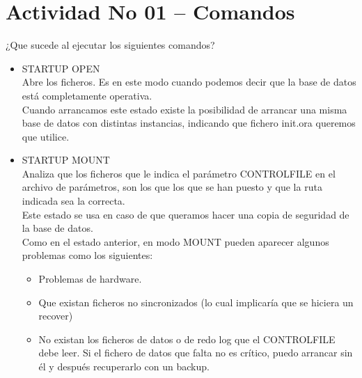 \section{Actividad No 01 – Comandos} 
¿Que sucede al ejecutar los siguientes comandos? 

\begin{itemize}
	\item STARTUP OPEN
	\\Abre los ficheros. Es en este modo cuando podemos decir que la base de datos está
		completamente operativa.
	\\Cuando arrancamos este estado existe la posibilidad de arrancar una misma base de datos
    con distintas instancias, indicando que fichero init.ora queremos que utilice.
	

	\item STARTUP MOUNT
	\\Analiza que los ficheros que le indica el parámetro CONTROLFILE en el archivo de
		parámetros, son los que los que se han puesto y que la ruta indicada sea la correcta.
	\\Este estado se usa en caso de que queramos hacer una copia de seguridad de la base de
		datos.
	\\Como en el estado anterior, en modo MOUNT pueden aparecer algunos problemas como los
		siguientes:
		
		\begin{itemize}
			\item Problemas de hardware.
			\item Que existan ficheros no sincronizados (lo cual implicaría que se hiciera un 	recover)
			\item No existan los ficheros de datos o de redo log que el CONTROLFILE debe leer. 
			Si el fichero de datos que falta no es crítico, puedo arrancar sin él y después recuperarlo 
			con un backup.
			
		\end{itemize}


\end{itemize} 